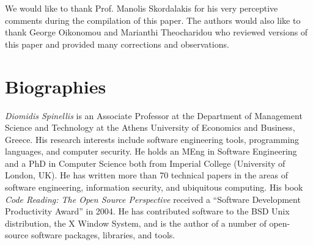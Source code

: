 \documentclass[10pt]{article}
\begin{document}
We would like to thank Prof. Manolis Skordalakis for his very perceptive comments during the compilation of this paper.
The authors would also like to thank George Oikonomou and Marianthi Theocharidou who reviewed versions 
of this paper and provided many corrections and observations.




\section*{Biographies}
\noindent
{\em Diomidis Spinellis} is an Associate Professor at the Department of Management Science and Technology at the Athens University of Economics and Business, 
Greece.  His research interests include software engineering tools, programming languages, and computer security.  He holds an MEng in Software Engineering 
and a PhD in Computer Science both from Imperial College (University of London, UK).  He has written more than 70  technical papers in the areas of 
software engineering, information security, and ubiquitous computing. 
His book {\em Code Reading: The Open Source Perspective}
received a ``Software Development Productivity Award'' in 2004.  He has contributed software to the BSD Unix distribution, the X Window System, 
and is the author of a number of open-source software packages, libraries, and tools.
\end{document}
